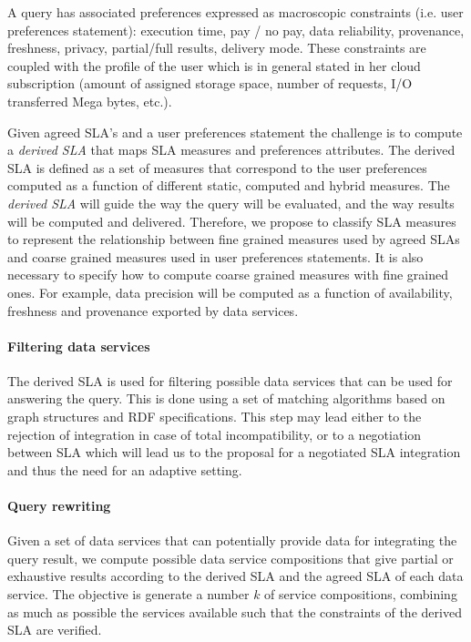 A query has associated preferences  expressed as macroscopic constraints (i.e. user preferences statement): execution time, pay / no pay, data reliability, provenance, freshness, privacy, partial/full results, delivery mode. These constraints are coupled with the profile of the user which is in general stated in her cloud subscription (amount of assigned storage space, number of requests, I/O transferred Mega bytes, etc.). 

Given agreed SLA's and a user preferences statement the challenge is to compute a  {\em derived SLA} that  maps SLA measures and preferences attributes.  The derived SLA is defined as a set of measures that correspond to the user preferences computed as a function of different static, computed and hybrid measures. The {\em derived SLA}  will guide the way the query will be evaluated, and the way results will be computed and delivered.
Therefore, we propose to classify SLA measures to represent the relationship between fine grained measures used by agreed SLAs and coarse grained measures used in user preferences statements. It is also necessary to specify how to compute coarse grained measures with fine grained ones. For example, data precision will be computed as a function of availability, freshness and provenance exported by data services. 

  
\paragraph{Filtering data services} 
The derived SLA  is used for filtering possible data services that can be used for answering the query. This is done using a set of matching algorithms based on  graph structures and RDF specifications. This step may lead either to the rejection of integration in case of total incompatibility, or to a negotiation between SLA which will lead us to the proposal for a negotiated SLA integration and thus the need for an adaptive setting.


\paragraph{Query rewriting} 
Given a set of data services that can potentially provide data for integrating the query result, we compute possible data service compositions that give partial or exhaustive  results according to the derived SLA and the agreed SLA of each data service. The objective is   generate a number $k$ of service compositions, combining as much as possible the services available such that the constraints of the derived SLA are verified. 


